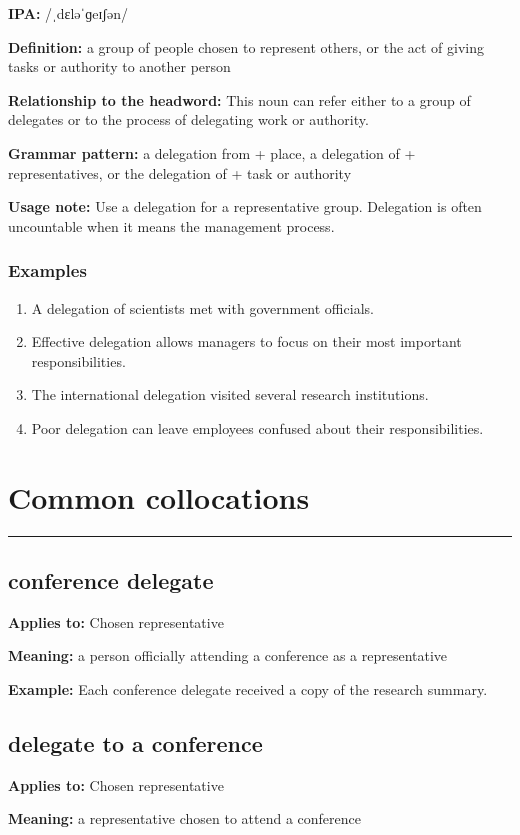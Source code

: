 \documentclass[11pt]{article}
\newcommand{\sectionrule}{\par\vspace{-0.5em}\noindent\textcolor{Accent}{\rule{\linewidth}{0.6pt}}\par}
\begin{document}
\textbf{IPA:} /ˌdɛləˈɡeɪʃən/

\textbf{Definition:} a group of people chosen to represent others, or the act of giving tasks or authority to another person

\textbf{Relationship to the headword:} This noun can refer either to a group of delegates or to the process of delegating work or authority.

\textbf{Grammar pattern:} a delegation from + place, a delegation of + representatives, or the delegation of + task or authority

\textbf{Usage note:} Use a delegation for a representative group. Delegation is often uncountable when it means the management process.

\subsubsection{Examples}
\begin{enumerate}
  \item A delegation of scientists met with government officials.
  \item Effective delegation allows managers to focus on their most important responsibilities.
  \item The international delegation visited several research institutions.
  \item Poor delegation can leave employees confused about their responsibilities.
\end{enumerate}

\section{Common collocations}
\sectionrule
\subsection{conference delegate}
\textbf{Applies to:} Chosen representative

\textbf{Meaning:} a person officially attending a conference as a representative

\textbf{Example:} Each conference delegate received a copy of the research summary.

\subsection{delegate to a conference}
\textbf{Applies to:} Chosen representative

\textbf{Meaning:} a representative chosen to attend a conference
\end{document}
